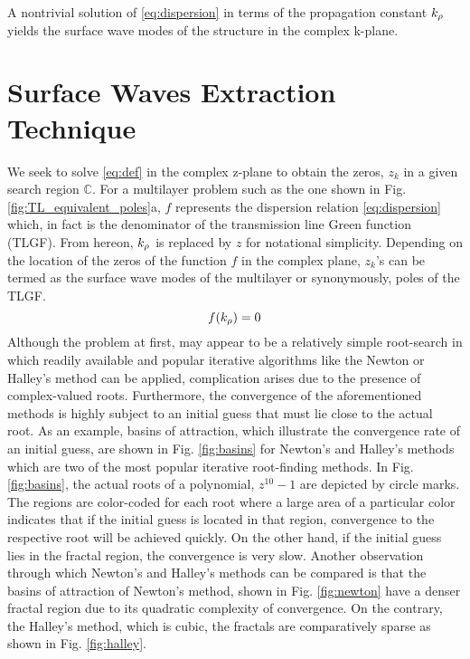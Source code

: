 A nontrivial solution of \eqref{eq:dispersion} in terms of the propagation constant $k_{\rho}$ yields the surface wave modes of the structure in the complex k-plane.
\section{Surface Waves Extraction Technique}
%
We seek to solve \eqref{eq:def} in the complex z-plane to obtain the zeros, $z_k$ in a given search region $\mathbb{C}$. For a multilayer problem such as the one shown in Fig. \ref{fig:TL_equivalent_poles}a, $f$ represents the dispersion relation \eqref{eq:dispersion} which, in fact is the denominator of the  transmission line Green function (TLGF). From hereon, $k_{\rho}$ is replaced by $z$ for notational simplicity. Depending on the location of the zeros of the function $f$ in the complex plane, $z_k$'s can be termed as the surface wave modes of the multilayer or synonymously, poles of the TLGF.
%
\begin{equation}
  f(k_{\rho}) = 0
  \label{eq:def}
\end{equation}
%
Although the problem at first, may appear to be a relatively simple root-search in which readily available and popular iterative algorithms like the Newton or Halley's method can be applied, complication arises due to the presence of complex-valued roots. Furthermore, the convergence of the aforementioned methods is highly subject to an initial guess that must lie close to the actual root. As an example, basins of attraction, which illustrate the convergence rate of an initial guess, are shown in Fig. \ref{fig:basins} for Newton's and Halley's methods which are two of the most popular iterative root-finding methods. In Fig. \ref{fig:basins}, the actual roots of a polynomial, $z^{10}-1$ are depicted by circle marks. The regions are color-coded for each root where a large area of a particular color indicates that if the initial guess is located in that region, convergence to the respective root will be achieved quickly. On the other hand, if the initial guess lies in the fractal region, the convergence is very slow. Another observation through which Newton's and Halley's methods can be compared is that the basins of attraction of Newton's method,
shown in Fig. \ref{fig:newton} have a denser fractal region due to its quadratic complexity of convergence. On the contrary, the Halley's method, which is cubic, the fractals are comparatively sparse as shown in Fig. \ref{fig:halley}.

